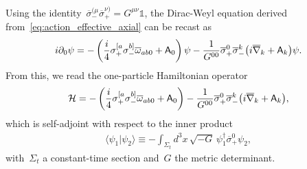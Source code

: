 \documentclass[11pt,a4paper]{article}
\begin{document}
Using the identity~$\overline{\sigma}_{-}^{(\mu}\overline{\sigma}_{+}^{\nu)}=G^{\mu\nu}\mathbb{1}$, 
the Dirac-Weyl equation derived from~\eqref{eq:action_effective_axial}
can be recast as
\begin{align}
i\partial_{0}\psi=-\left({i\over 4}\sigma_{+}^{[a}\sigma_{-}^{b]}
\overline{\omega}_{ab0}+\mathsf{A}_{0}\right)\psi
-{1\over G^{00}}\overline{\sigma}_{+}^{0}\overline{\sigma}_{-}^{k}\big(i\overline{\nabla}_{k}
+\mathsf{A}_{k}\big)\psi.
\end{align}
From this, we read the one-particle Hamiltonian operator
\begin{align}
\mathcal{H}=-\left({i\over 4}\sigma_{+}^{[a}\sigma_{-}^{b]}\overline{\omega}_{ab0}
+\mathsf{A}_{0}\right)
-{1\over G^{00}}\overline{\sigma}_{+}^{0}\overline{\sigma}_{-}^{k}\big(i\overline{\nabla}_{k}
+\mathsf{A}_{k}\big),
\label{eq:hamiltonian_general}
\end{align}
which is self-adjoint with respect to the inner product
\begin{align}
\langle\psi_{1}|\psi_{2}\rangle\equiv 
-\int_{\Sigma_{t}} d^{3}x\,\sqrt{-G}\,\psi_{1}^{\dagger}
\overline{\sigma}_{+}^{0}
\psi_{2},
\end{align}
with~$\Sigma_{t}$ a constant-time section and~$G$ the metric determinant. 
\end{document}
